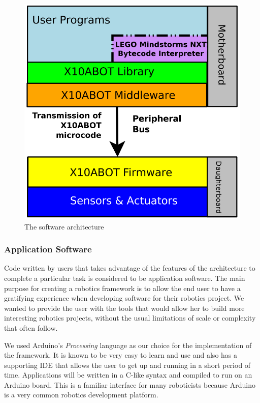 	\begin{figure}[h]
	  \begin{center}
	    \includegraphics[width=0.7\columnwidth]{Figures/system.pdf}
	    \caption{The \xten software architecture}
	  \end{center}
	\end{figure}
	
	


	\subsubsection{Application Software} %
	\label{ssub:application_software}
	Code written by users that takes advantage of the features of the \xten architecture to complete a particular task is considered to be application software. The main purpose for creating a robotics framework is to allow the end user to have a gratifying experience when developing software for their robotics project. We wanted to provide the user with the tools that would allow her to build more interesting robotics projects, without the usual limitations of scale or complexity that often follow. 
	
	We used Arduino's \emph{Processing} language as our choice for the implementation of the framework. It is known to be very easy to learn and use and also has a supporting IDE that allows the user to get up and running in a short period of time. 
	Applications will be written in a C-like syntax and compiled to run on an Arduino board. This is a familiar interface for many roboticists because Arduino is a very common robotics development platform.
	
